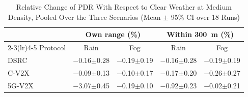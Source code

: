 \begin{table}[t]
\caption{Relative Change of PDR With Respect to Clear Weather at Medium Density, Pooled Over the Three Scenarios (Mean $\pm$ 95\% CI over 18 Runs)}
\label{tab:weather}
\centering\footnotesize
\begin{tabular}{@{}lcccc@{}}
\toprule
& \multicolumn{2}{c}{Own range (\%)} & \multicolumn{2}{c}{Within 300~m (\%)} \\
\cmidrule(lr){2-3}\cmidrule(lr){4-5}
Protocol & Rain & Fog & Rain & Fog \\
\midrule
DSRC & $-$0.16$\pm$0.28 & $-$0.19$\pm$0.19 & $-$0.16$\pm$0.28 & $-$0.19$\pm$0.19 \\
C-V2X & $-$0.09$\pm$0.13 & $-$0.10$\pm$0.17 & $-$0.17$\pm$0.20 & $-$0.26$\pm$0.27 \\
5G-V2X & $-$3.07$\pm$0.45 & $-$0.19$\pm$0.10 & $-$0.92$\pm$0.23 & $-$0.02$\pm$0.21 \\
\bottomrule
\end{tabular}
\end{table}
